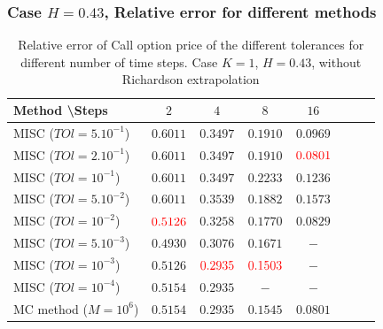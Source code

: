 \documentclass[11pt]{article}
\begin{document}
\newpage

\subsubsection{Case $H=0.43$, Relative error for different methods}
\label{sec:Case $H=0.43$, Relative error for different methods}

\begin{table}[h!]
	\centering
	\begin{tabular}{l*{6}{c}r}
		Method \textbackslash  Steps            & $2$ & $4$ & $8$ & $16$ &   \\
		\hline
		MISC ($TOl=5.10^{-1}$)  & $0.6011$ & $0.3497$ & $0.1910$ & $0.0969$  \\
		MISC ($TOl=2.10^{-1}$)  &  $0.6011$ & $0.3497$ &$0.1910$ & ${\color{red}0.0801}$  \\
		MISC ($TOl=10^{-1}$)  & $0.6011$ & $0.3497$ & $0.2233$ & $0.1236$  \\
		MISC ($TOl=5.10^{-2}$)  & $0.6011$ & $0.3539$ & $0.1882$ & $0.1573$  \\
		MISC ($TOl=10^{-2}$)  & ${\color{red}0.5126}$ & $0.3258$ & $0.1770$ & $0.0829$   \\	
		MISC ($TOl=5.10^{-3}$)  & $	0.4930$ & $0.3076$ & $0.1671$ & $-$   \\	
	    MISC ($TOl=10^{-3}$)  & $		0.5126$ & ${\color{red}0.2935}$ & ${\color{red}0.1503}$ & $-$   \\
	MISC ($TOl=10^{-4}$)  & $		0.5154$ & $0.2935$ & $-$ & $-$   \\
			MC method ($M=10^{6}$)   & $\mathbf{0.5154}$  & $\mathbf{0.2935}$  & $\mathbf{0.1545}$ & $\mathbf{0.0801}$  \\	
		\hline
	\end{tabular}
	\caption{Relative error of Call option price of the different tolerances for different number of time steps. Case $K=1$, $H=0.43$, without Richardson extrapolation}
	\label{Relative error of Call option price of the different tolerances for different number of time steps. Case $K=1, H=0.43$}
\end{table}
\end{document}
